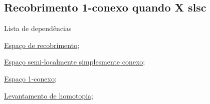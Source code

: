 \subsection{Recobrimento 1-conexo quando X slsc} %
\label{recobrimento-1-conexo-prop}
\begin{titlemize}{Lista de dependências}
    \item \hyperref[espaco-de-recobrimento-def]{Espaço de recobrimento};\\
	\item \hyperref[espaço-semi-localmente-simplesmente-conexo-def]{Espaço semi-localmente simplesmente conexo};\\ %
	\item \hyperref[espaço-1-conexo-def]{Espaço 1-conexo};\\
    \item \hyperref[levantamento-de-homotopia-prop]{Levantamento de homotopia};\\
\end{titlemize}

